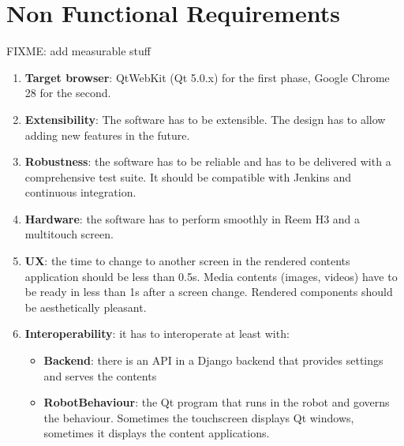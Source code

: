 \section{Non Functional Requirements}
FIXME: add measurable stuff
\begin{enumerate}
    \item \textbf{Target browser}: QtWebKit (Qt 5.0.x) for the first phase, Google Chrome 28 for the second.
    \item \textbf{Extensibility}: The software has to be extensible. The design has to allow adding new features in the future.
    \item \textbf{Robustness}: the software has to be reliable and has to be delivered with a comprehensive test suite. It should be compatible with Jenkins and continuous integration.
    \item \textbf{Hardware}: the software has to perform smoothly in Reem H3 and a multitouch screen.
    \item \textbf{\ac{UX}}: the time to change to another screen in the rendered contents application should be less than 0.5s. Media contents (images, videos) have to be ready in less than 1s after a screen change. Rendered components should be aesthetically pleasant.
    \item \textbf{Interoperability}: it has to interoperate at least with:
    \begin{itemize}
        \item \textbf{Backend}: there is an \ac{API} in a Django backend that provides settings and serves the contents
        \item \textbf{RobotBehaviour}: the Qt program that runs in the robot and governs the behaviour. Sometimes the touchscreen displays Qt windows, sometimes it displays the content applications. 
    \end{itemize}
\end{enumerate}